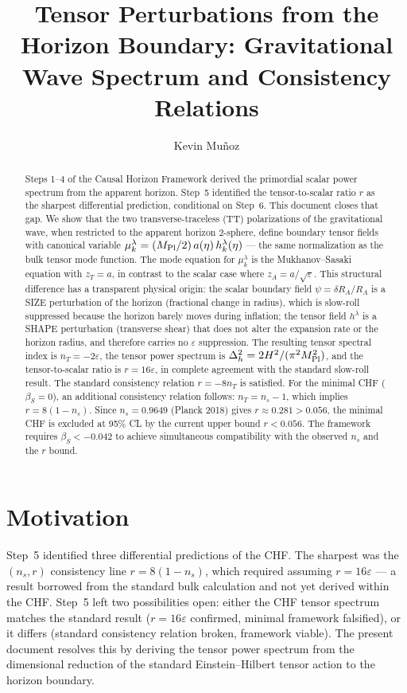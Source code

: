 \documentclass[12pt,a4paper]{article}
\title{Tensor Perturbations from the Horizon Boundary: Gravitational Wave Spectrum and Consistency Relations}
\author{Kevin Mu\~noz}
\date{}
\begin{document}
\maketitle

\begin{abstract}
Steps 1--4 of the Causal Horizon Framework derived the primordial scalar power spectrum from the apparent horizon. Step~5 identified the tensor-to-scalar ratio $r$ as the sharpest differential prediction, conditional on Step~6. This document closes that gap. We show that the two transverse-traceless (TT) polarizations of the gravitational wave, when restricted to the apparent horizon 2-sphere, define boundary tensor fields with canonical variable $\mu_k^\lambda = (M_{\rm Pl}/2)\,a(\eta)\,h_k^\lambda(\eta)$ --- the same normalization as the bulk tensor mode function. The mode equation for $\mu_k^\lambda$ is the Mukhanov--Sasaki equation with $z_T = a$, in contrast to the scalar case where $z_A = a/\sqrt\varepsilon$. This structural difference has a transparent physical origin: the scalar boundary field $\psi = \delta R_A/R_A$ is a SIZE perturbation of the horizon (fractional change in radius), which is slow-roll suppressed because the horizon barely moves during inflation; the tensor field $h^\lambda$ is a SHAPE perturbation (transverse shear) that does not alter the expansion rate or the horizon radius, and therefore carries no $\varepsilon$ suppression. The resulting tensor spectral index is $n_T = -2\varepsilon$, the tensor power spectrum is $\Delta_h^2 = 2H^2/(\pi^2 M_{\rm Pl}^2)$, and the tensor-to-scalar ratio is $r = 16\varepsilon$, in complete agreement with the standard slow-roll result. The standard consistency relation $r = -8n_T$ is satisfied. For the minimal CHF ($\beta_S = 0$), an additional consistency relation follows: $n_T = n_s - 1$, which implies $r = 8(1-n_s)$. Since $n_s = 0.9649$ (Planck 2018) gives $r \approx 0.281 > 0.056$, the minimal CHF is excluded at 95\% CL by the current upper bound $r < 0.056$. The framework requires $\beta_S < -0.042$ to achieve simultaneous compatibility with the observed $n_s$ and the $r$ bound.
\end{abstract}

\section{Motivation}

Step~5 identified three differential predictions of the CHF. The sharpest was the $(n_s, r)$ consistency line $r = 8(1-n_s)$, which required assuming $r = 16\varepsilon$ --- a result borrowed from the standard bulk calculation and not yet derived within the CHF. Step~5 left two possibilities open: either the CHF tensor spectrum matches the standard result ($r = 16\varepsilon$ confirmed, minimal framework falsified), or it differs (standard consistency relation broken, framework viable). The present document resolves this by deriving the tensor power spectrum from the dimensional reduction of the standard Einstein--Hilbert tensor action to the horizon boundary.
\end{document}
